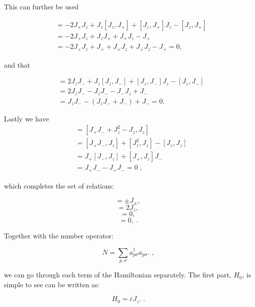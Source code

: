 This can further be used 

\begin{align*}
[J^2, J_+] &= -2J_+ J_z + J_z [J_z,J_+] + [J_z,J_+] J_z - [J_z,J_+] \\
&= -2J_+ J_z + J_z J_+ + J_+ J_z - J_+ \\
&= -2J_+ J_z + J_+ + J_+ J_z + J_+ J_z - J_+ = 0,
\end{align*}

and that

\begin{align*}
[J^2, J_-] &= 2J_z J_- + J_z [J_z,J_-] + [J_z,J_-] J_z - [J_z,J_-] \\
&= 2J_z J_- - J_z J_- - J_- J_z + J_- \\
&= J_z J_- - (J_z J_- + J_-) + J_- = 0.
\end{align*}

Lastly we have
\begin{align*}
[J^2,J_z] &= [J_+ J_- + J_z^2 - J_z, J_z] \\
&= [J_+ J_-, J_z] + [J_z^2, J_z] - [J_z, J_z] \\
&= J_+ [J_-, J_z] + [J_+,J_z] J_- \\
&= J_+ J_- - J_+ J_- = 0 \; ,
\end{align*}

which completes the set of relations:

\begin{equation}
[J_z, J_\pm] = \pm J_\pm, \label{eq:kJzJpm} \,
\end{equation}
\begin{equation} 
[J_+, J_-] = 2J_z, \label{eq:kJpJm} \,
\end{equation}
\begin{equation} 
[J^2, J_\pm] = 0, \label{eq:kJ2Jpm} \, 
\end{equation}
\begin{equation} 
[J^2,J_z] = 0, \label{eq:kJ2Jz} \; .
\end{equation}

Together with the number operator:

\begin{equation}
N = \sum_{p,\sigma} a_{p\sigma}^\dagger a_{p\sigma}.
\label{eq:N} \; ,
\end{equation}

we can go through each term of the Hamiltonian separately. The first part, $H_0$, is simple to see can be written as:

\begin{equation}
H_0 = \varepsilon J_z.
\label{eq:H0ny} \; .
\end{equation}

